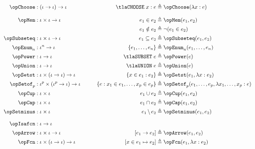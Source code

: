 \documentclass[11pt, a4paper, oneside]{article}
\begin{document}
\begin{alignat*}{4}
    \opChoose       &: (\idv \arr \idv) \arr \idv                   &\qquad \tlaCHOOSE\; x : e      &\triangleq \opChoose(\lambda x : e) \\[7pt]
    \opMem          &: \idv \times \idv \arr \idv                   &\qquad e_1 \in e_2             &\triangleq \opMem(e_1, e_2) \\
                                                                &   &\qquad e_1 \notin e_2          &\triangleq \neg (e_1 \in e_2) \\
    \opSubseteq     &: \idv \times \idv \arr \idv                   &\qquad e_1 \subseteq e_2       &\triangleq \opSubseteq(e_1, e_2) \\
    \opEnum_n       &: \idv^n \arr \idv                             &\qquad \st{ e_1, \dots, e_n }  &\triangleq \opEnum_n(e_1, \dots, e_n) \\
    \opPower        &: \idv \arr \idv                               &\qquad \tlaSUBSET\; e          &\triangleq \opPower(e) \\
    \opUnion        &: \idv \arr \idv                               &\qquad \tlaUNION\; e           &\triangleq \opUnion(e) \\
    \opSetst        &: \idv \times (\idv \arr \idv) \arr \idv       &\qquad \st{ x \in e_1 : e_2 }  &\triangleq \opSetst(e_1, \lambda x : e_2) \\
    \opSetof_p      &: \idv^p \times (\idv^p \arr \idv) \arr \idv   &\qquad \st{ e : x_1 \in e_1, \dots, x_p \in e_p }  &\triangleq \opSetof_p(e_1, \dots, e_p, \lambda x_1, \dots, x_p : e) \\
    \opCup          &: \idv \times \idv                             &\qquad e_1 \cup e_2            &\triangleq \opCup(e_1, e_2) \\
    \opCap          &: \idv \times \idv                             &\qquad e_1 \cap e_2            &\triangleq \opCap(e_1, e_2) \\
    \opSetminus     &: \idv \times \idv                             &\qquad e_1 \,\backslash\, e_2    &\triangleq \opSetminus(e_1, e_2) \\[7pt]
    \opIsafcn       &: \idv \arr \idv \\
    \opArrow        &: \idv \times \idv \arr \idv                   &\qquad \bx{ e_1 \arr e_2 }     &\triangleq \opArrow(e_1, e_2) \\
    \opFcn          &: \idv \times (\idv \arr \idv) \arr \idv       &\qquad \bx{ x \in e_1 \mapsto e_2 }  &\triangleq \opFcn(e_1, \lambda x : e_2) \\

\end{alignat*}
\end{document}
